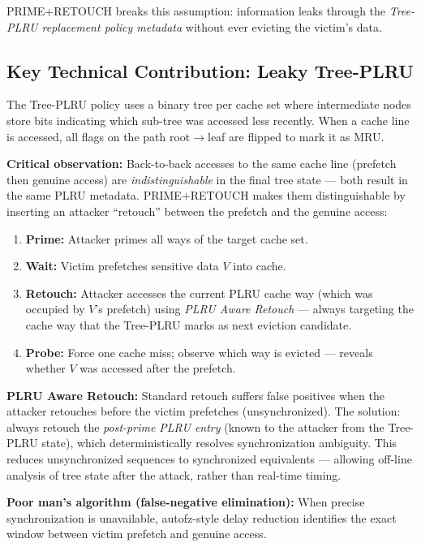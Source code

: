 \documentclass[11pt,letterpaper]{article}
\begin{document}
PRIME+RETOUCH breaks this assumption: information leaks through the \emph{Tree-PLRU replacement policy metadata} without ever evicting the victim's data.

\subsection*{Key Technical Contribution: Leaky Tree-PLRU}
The Tree-PLRU policy uses a binary tree per cache set where intermediate nodes store bits indicating which sub-tree was accessed less recently.
When a cache line is accessed, all flags on the path root$\to$leaf are flipped to mark it as MRU.

\textbf{Critical observation:} Back-to-back accesses to the same cache line (prefetch then genuine access) are \emph{indistinguishable} in the final tree state — both result in the same PLRU metadata.
PRIME+RETOUCH makes them distinguishable by inserting an attacker ``retouch'' between the prefetch and the genuine access:

\begin{enumerate}
    \item \textbf{Prime:} Attacker primes all ways of the target cache set.
    \item \textbf{Wait:} Victim prefetches sensitive data $V$ into cache.
    \item \textbf{Retouch:} Attacker accesses the current PLRU cache way (which was occupied by $V$'s prefetch) using \emph{PLRU Aware Retouch} — always targeting the cache way that the Tree-PLRU marks as next eviction candidate.
    \item \textbf{Probe:} Force one cache miss; observe which way is evicted — reveals whether $V$ was accessed after the prefetch.
\end{enumerate}

\textbf{PLRU Aware Retouch:} Standard retouch suffers false positives when the attacker retouches before the victim prefetches (unsynchronized).
The solution: always retouch the \emph{post-prime PLRU entry} (known to the attacker from the Tree-PLRU state), which deterministically resolves synchronization ambiguity.
This reduces unsynchronized sequences to synchronized equivalents — allowing off-line analysis of tree state after the attack, rather than real-time timing.

\textbf{Poor man's algorithm (false-negative elimination):} When precise synchronization is unavailable, autofz-style delay reduction identifies the exact window between victim prefetch and genuine access.
\end{document}
